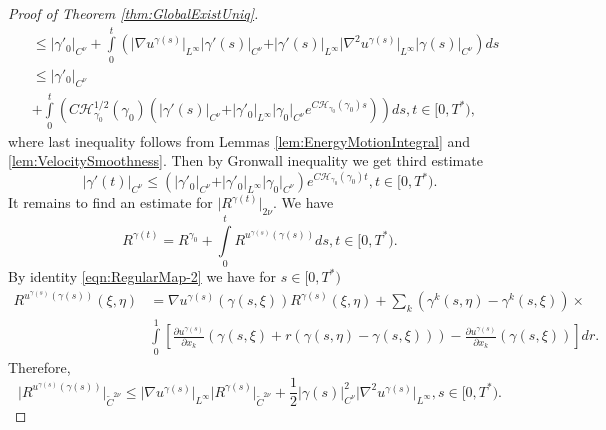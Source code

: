 \documentclass[11pt,a4paper,leqno]{amsart}%
\theoremstyle{plain}
\theoremstyle{remark}
\theoremstyle{plain}
\numberwithin{equation}{section}
\def\suml{\sum\limits}
\def\intl{\int\limits}
\begin{document}
\begin{proof}[Proof of Theorem \ref{thm:GlobalExistUniq}]
\begin{align}
&\leq\vert \gamma'_0\vert_{C^{\nu}}+\intl_0^t(\vert \nabla
u^{\gamma(s)}\vert_{L^{\infty}}\vert \gamma'(s)\vert_{C^{\nu}}+\vert \gamma'(s)\vert_{L^{\infty}}\vert \nabla^2
u^{\gamma(s)}\vert_{L^{\infty}}\vert \gamma(s)\vert_{C^{\nu}})ds\nonumber\\
&\leq\vert \gamma'_0\vert_{C^{\nu}}\nonumber\\
&+\intl_0^t(C\mathcal{H}_{\gamma_0}^{1/2}(\gamma_0)(\vert \gamma'(s)\vert_{C^{\nu}}+\vert \gamma'_0\vert_{L^{\infty}}\vert \gamma_0\vert_{C^{\nu}}e^{C\mathcal{H}_{\gamma_0}(\gamma_0)s}))ds,t\in[0,T^*),
\end{align}
where last inequality follows from Lemmas
\ref{lem:EnergyMotionIntegral} and \ref{lem:VelocitySmoothness}.
Then by Gronwall inequality we get third estimate
\begin{equation}
\vert \gamma'(t)\vert_{C^{\nu}}\leq(\vert \gamma'_0\vert_{C^{\nu}}+\vert \gamma'_0\vert_{L^{\infty}}\vert \gamma_0\vert_{C^{\nu}})e^{C\mathcal{H}_{\gamma_0}(\gamma_0)t},t\in[0,T^*).\label{eqn:GEUEstim-3}
\end{equation}
It remains to find an estimate for $\vert R^{\gamma(t)}\vert_{2\nu}$. We
have
\begin{equation}
R^{\gamma(t)}=R^{\gamma_0}+\intl_0^tR^{u^{\gamma(s)}(\gamma(s))}ds,t\in[0,T^*).
\end{equation}
By identity \eqref{eqn:RegularMap-2} we have for $s\in[0,T^*)$
\begin{align}
R^{u^{\gamma(s)}(\gamma(s))}(\xi,\eta)&=\nabla
u^{\gamma(s)}(\gamma(s,\xi))R^{\gamma(s)}(\xi,\eta)+
\suml_k(\gamma^k(s,\eta)-\gamma^k(s,\xi))\times\nonumber\\
&\intl_0^1\left[\frac{\partial u^{\gamma(s)}}{\partial
x_k}(\gamma(s,\xi)+r(\gamma(s,\eta)-\gamma(s,\xi)))-\frac{\partial
u^{\gamma(s)}}{\partial
x_k}(\gamma(s,\xi))\right]dr.\label{eqn:GEUEstim-aux3}
\end{align}
Therefore,
\begin{equation}
\vert R^{u^{\gamma(s)}(\gamma(s))}\vert_{\tilde{C}^{2\nu}}\leq \vert \nabla
u^{\gamma(s)}\vert_{L^{\infty}}\vert R^{\gamma(s)}\vert_{\tilde{C}^{2\nu}}+\frac{1}{2}\vert \gamma(s)\vert_{C^{\nu}}^2\vert \nabla^2
u^{\gamma(s)}\vert_{L^{\infty}},s\in[0,T^*).\label{eqn:GEUEstim-aux4}

\end{equation}
\end{proof}
\end{document}
